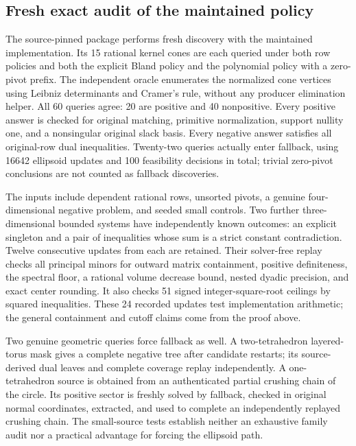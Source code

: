 \subsection{Fresh exact audit of the maintained policy}

The source-pinned package  performs fresh
discovery with the maintained implementation.  Its 15 rational kernel cones
are each queried under both row policies and both the explicit Bland policy
and the polynomial policy with a zero-pivot prefix.  The independent oracle
enumerates the normalized cone vertices using Leibniz determinants and
Cramer's rule, without any producer elimination helper.  All 60 queries
agree: 20 are positive and 40 nonpositive.  Every positive answer is checked
for original matching, primitive normalization, support nullity one, and a
nonsingular original slack basis.  Every negative answer satisfies all
original-row dual inequalities.  Twenty-two queries actually enter fallback,
using 16642 ellipsoid updates and 100 feasibility decisions in total;
trivial zero-pivot conclusions are not counted as fallback discoveries.

The inputs include dependent rational rows, unsorted pivots, a genuine
four-dimensional negative problem, and seeded small controls.  Two further
three-dimensional bounded systems have independently known outcomes: an
explicit singleton and a pair of inequalities whose sum is a strict
constant contradiction.  Twelve consecutive updates from each are retained.
Their solver-free replay checks all principal minors for outward matrix
containment, positive definiteness, the spectral floor, a rational volume
decrease bound, nested dyadic precision, and exact center rounding.  It also
checks 51 signed integer-square-root ceilings by squared inequalities.
These 24 recorded updates test implementation arithmetic; the general
containment and cutoff claims come from the proof above.

Two genuine geometric queries force fallback as well.  A two-tetrahedron
layered-torus mask gives a complete negative tree after candidate restarts;
its source-derived dual leaves and complete coverage replay independently.
A one-tetrahedron source is obtained from an authenticated partial crushing
chain of the circle.  Its positive sector is freshly solved by fallback,
checked in original normal coordinates, extracted, and used to complete an
independently replayed crushing chain.  The small-source tests establish
neither an exhaustive family audit nor a practical advantage for forcing
the ellipsoid path.

